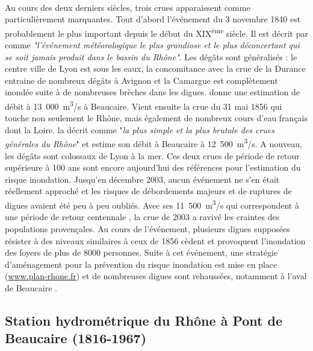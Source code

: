 \documentclass[11pt]{article}
\begin{document}
	\paragraph{} Au cours des deux derniers siècles, trois crues apparaissent comme particulièrement marquantes. Tout d'abord l'événement du 3 novembre 1840 est probablement le plus important depuis le début du XIX\textsuperscript{ème} siècle. Il est décrit par \citet{parde_regime_1925} comme \textit{"l'événement météorologique le plus grandiose et le plus déconcertant qui se soit jamais produit dans le bassin du Rhône"}. Les dégâts sont généralisés : le centre ville de Lyon est sous les eaux, la concomitance avec la crue de la Durance entraine de nombreux dégâts à Avignon et la Camargue est complètement inondée suite à de nombreuses brèches dans les digues. \citet{parde_regime_1925} donne une estimation de débit à 13~000~m\textsuperscript{3}/s à Beaucaire. Vient ensuite la crue du 31 mai 1856 qui touche non seulement le Rhône, mais également de nombreux cours d'eau français dont la Loire. \citet{parde_regime_1925} la décrit comme "\textit{la plus simple et la plus brutale des crues générales du Rhône}" et estime son débit à Beaucaire à 12~500~m\textsuperscript{3}/s. A nouveau, les dégâts sont colossaux de Lyon à la mer. Ces deux crues de période de retour supérieure à 100 ans sont encore aujourd'hui des références pour l'estimation du risque inondation. Jusqu'en décembre 2003, aucun événement ne s'en était réellement approché et les risques de débordements majeurs et de ruptures de digues avaient été peu à peu oubliés. Avec ses 11~500~m\textsuperscript{3}/s qui correspondent à une période de retour centennale \citep{medd_debit_2005}, la crue de 2003 a ravivé les craintes des populations provençales. Au cours de l'événement, plusieurs digues supposées résister à des niveaux similaires à ceux de 1856 cèdent et provoquent l'inondation des foyers de plus de 8000 personnes. Suite à cet événement, une stratégie d'aménagement pour la prévention du risque inondation est mise en place (\url{www.plan-rhone.fr}) et de nombreuses digues sont rehaussées, notamment à l'aval de Beaucaire \citep{symadrem_programme_2012}. 
	
	
\FloatBarrier

	\subsection{Station hydrométrique du Rhône à Pont de Beaucaire (1816-1967)}
		
\end{document}
